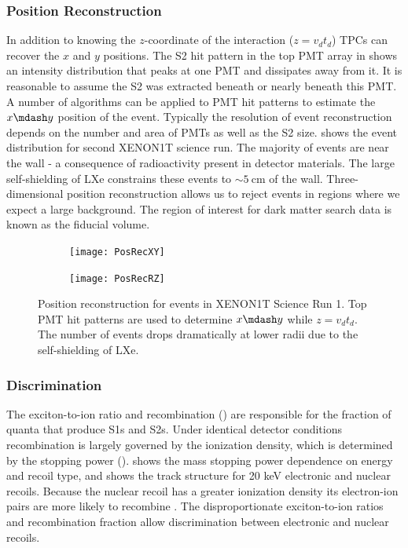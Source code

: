 \subsubsection{Position Reconstruction}
\label{subsubsec:tpcs_signals_posrec}
In addition to knowing the $z$-coordinate of the interaction ($z = v_{d} t_{d}$) TPCs can recover the $x$ and $y$ positions.  The S2
hit pattern in the top PMT array in  shows an intensity distribution that peaks at one
PMT and dissipates away from it.  It is reasonable to assume the S2 was extracted beneath or nearly beneath this PMT.  A number of
algorithms can be applied to PMT hit patterns to estimate the $x \mdash y$ position of the event.  Typically the resolution of event
reconstruction depends on the number and area of PMTs as well as the S2 size.   shows the event
distribution for second XENON1T science run.  The majority of events are near the wall - a consequence of
radioactivity present in detector materials.  The large self-shielding of LXe constrains these events to ${\sim}5\ \mathrm{cm}$ of the
wall.  Three-dimensional position reconstruction allows us to reject events in regions where we
expect a large background.  The region of interest for dark matter search data is known as the fiducial volume.

\begin{figure}
    \centering
    \begin{subfigure}[t]{0.45\textwidth}
        \centering
        \texttt{[image: PosRecXY]}
    \end{subfigure}%
    \begin{subfigure}[t]{0.45\textwidth}
        \centering
        \texttt{[image: PosRecRZ]}
    \end{subfigure}
    \caption{Position reconstruction for events in XENON1T Science Run 1.  Top PMT hit patterns are used to determine $x \mdash y$ while
    $z = v_{d} t_{d}$.  The number of events drops dramatically at lower radii due to the self-shielding of LXe.}
	\label{fig:tpcs_signals_posrec}
\end{figure}



\subsubsection{Discrimination}
\label{subsubsec:tpcs_signals_discr}
The exciton-to-ion ratio and recombination () are responsible for the fraction of quanta that produce S1s
and S2s.  Under identical
detector conditions recombination is largely governed by the ionization density, which is determined by the stopping power
().   shows the mass stopping power dependence on energy and recoil type,
and  shows the track structure for 20 keV electronic and nuclear recoils.  Because the nuclear recoil has
a greater ionization density its electron-ion pairs are more likely to recombine .  The disproportionate exciton-to-ion
ratios and recombination fraction allow discrimination between electronic and nuclear recoils.

